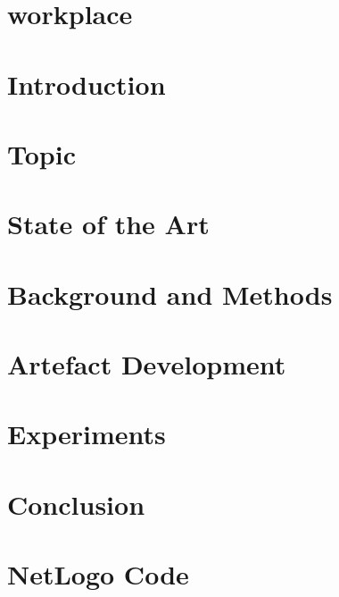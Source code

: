\documentclass[12pt]{report}
\begin{document}

\pagestyle{fancy}
\rfoot{\thepage}
\cfoot{}






\newpage
\tableofcontents
\listoffigures
\listoftables
\clearpage


\pagestyle{plain}

\chapter{workplace}
\label{sec:workplace}


\chapter{Introduction}
\label{sec:intro}


\chapter{Topic}
\label{sec:Slimemold}


\chapter{State of the Art}
\label{sec:relatedwork}


\chapter{Background and Methods}
\label{sec:methods}


\chapter{Artefact Development}
\label{sec:implementation}


\chapter{Experiments}
\label{sec:experiments}


\chapter{Conclusion}
\label{sec:conclusion}


\newpage




\newpage

\appendix
{}
\chapter{NetLogo Code}
\label{sec:appendix-netlogo}


\end{document}
